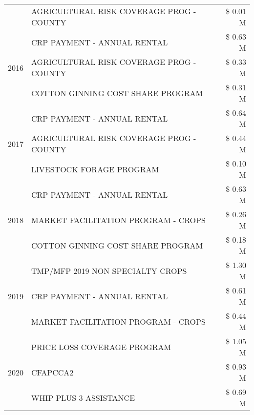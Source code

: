 \begin{tabular}{llr}
 & AGRICULTURAL RISK COVERAGE PROG - COUNTY & \$ 0.01 M \\
\cline{1-3}
\multirow[t]{3}{*}{2016} & CRP PAYMENT - ANNUAL RENTAL & \$ 0.63 M \\
 & AGRICULTURAL RISK COVERAGE PROG - COUNTY & \$ 0.33 M \\
 & COTTON GINNING COST SHARE PROGRAM & \$ 0.31 M \\
\cline{1-3}
\multirow[t]{3}{*}{2017} & CRP PAYMENT - ANNUAL RENTAL & \$ 0.64 M \\
 & AGRICULTURAL RISK COVERAGE PROG - COUNTY & \$ 0.44 M \\
 & LIVESTOCK FORAGE PROGRAM & \$ 0.10 M \\
\cline{1-3}
\multirow[t]{3}{*}{2018} & CRP PAYMENT - ANNUAL RENTAL & \$ 0.63 M \\
 & MARKET FACILITATION PROGRAM - CROPS & \$ 0.26 M \\
 & COTTON GINNING COST SHARE PROGRAM & \$ 0.18 M \\
\cline{1-3}
\multirow[t]{3}{*}{2019} & TMP/MFP 2019 NON SPECIALTY CROPS & \$ 1.30 M \\
 & CRP PAYMENT - ANNUAL RENTAL & \$ 0.61 M \\
 & MARKET FACILITATION PROGRAM - CROPS & \$ 0.44 M \\
\cline{1-3}
\multirow[t]{3}{*}{2020} & PRICE LOSS COVERAGE PROGRAM & \$ 1.05 M \\
 & CFAPCCA2 & \$ 0.93 M \\
 & WHIP PLUS 3 ASSISTANCE & \$ 0.69 M \\
\cline{1-3}
\bottomrule
\end{tabular}
